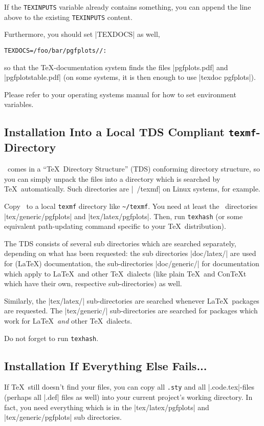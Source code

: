 If the \texttt{TEXINPUTS} variable already contains something, you can append the line above to the existing \texttt{TEXINPUTS} content.

Furthermore, you should set |TEXDOCS| as well,
\begin{verbatim}
TEXDOCS=/foo/bar/pgfplots//:
\end{verbatim}
so that the \TeX-documentation system finds the files |pgfplots.pdf| and |pgfplotstable.pdf| (on some systems, it is then enough to use |texdoc pgfplots|).

Please refer to your operating systems manual for how to set environment variables.

\subsection{Installation Into a Local TDS Compliant \texttt{texmf}-Directory}
\label{pgfplots:tds}
\PGFPlots\ comes in a ``\TeX\ Directory Structure'' (TDS) conforming directory structure, so you can simply unpack the files into a directory which is searched by \TeX\ automatically. Such directories are |~/texmf| on Linux systems, for example.

Copy \PGFPlots\ to a local \texttt{texmf} directory like \lstinline!~/texmf!. You need at least the \PGFPlots\ directories |tex/generic/pgfplots| and |tex/latex/pgfplots|. Then, run \lstinline!texhash! (or some equivalent path-updating command specific to your \TeX\ distribution). 

The TDS consists of several sub directories which are searched separately, depending on what has been requested: the sub directories |doc/latex/| are used for (\LaTeX) documentation, the sub-directories |doc/generic/| for documentation which apply to \LaTeX\ and other \TeX\ dialects (like plain \TeX\ and Con\TeX t which have their own, respective sub-directories) as well.

Similarly, the |tex/latex/| sub-directories are searched whenever \LaTeX\ packages are requested. The |tex/generic/| sub-directories are searched for packages which work for \LaTeX\ \emph{and} other \TeX\ dialects.

Do not forget to run \lstinline!texhash!.

\subsection{Installation If Everything Else Fails...}
If \TeX\ still doesn't find your files, you can copy all \lstinline!.sty! and all |.code.tex|-files (perhaps all |.def| files as well) into your current project's working directory. In fact, you need everything which is in the |tex/latex/pgfplots| and |tex/generic/pgfplots| sub directories.

